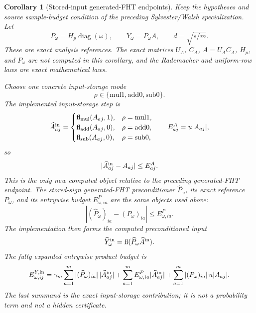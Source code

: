 \documentclass[11pt]{article}
\newcommand{\fl}{\operatorname{fl}}
\newcommand{\diag}{\operatorname{diag}}
\newtheorem{corollary}[theorem]{Corollary}
\theoremstyle{remark}
\begin{document}
\begin{corollary}[Stored-input generated-FHT endpoints]
Keep the hypotheses and source sample-budget condition of the preceding
Sylvester/Walsh specialization.  Let
\[
  P_\omega=H_p\diag(\omega),
  \qquad
  Y_\omega=P_\omega A,
  \qquad
  d=\sqrt{s/m}.
\]
These are exact analysis references.  The exact matrices \(U_A\), \(C_A\),
\(A=U_AC_A\), \(H_p\), and \(P_\omega\) are not computed in this corollary,
and the Rademacher and uniform-row laws are exact mathematical laws.

Choose one concrete input-storage mode
\[
  \rho\in\{\mathrm{mul1},\mathrm{add0},\mathrm{sub0}\}.
\]
The implemented input-storage step is
\[
  \widehat A^{\rm in}_{aj}=
  \begin{cases}
    \fl_{\rm mul}(A_{aj},1),&\rho=\mathrm{mul1},\\
    \fl_{\rm add}(A_{aj},0),&\rho=\mathrm{add0},\\
    \fl_{\rm sub}(A_{aj},0),&\rho=\mathrm{sub0},
  \end{cases}
  \qquad
  E^A_{aj}=u|A_{aj}|,
\]
so
\[
  |\widehat A^{\rm in}_{aj}-A_{aj}|\le E^A_{aj}.
\]
This is the only new computed object relative to the preceding
generated-FHT endpoint.  The stored-sign generated-FHT preconditioner
\(\widehat P_\omega\), its exact reference \(P_\omega\), and its entrywise
budget \(E^P_{\omega,ia}\) are the same objects used above:
\[
  |(\widehat P_\omega)_{ia}-(P_\omega)_{ia}|
  \le E^P_{\omega,ia}.
\]
The implementation then forms the computed preconditioned input
\[
  \widehat Y^{\rm in}_{\omega}
  =
  \fl(\widehat P_\omega \widehat A^{\rm in}).
\]
The fully expanded entrywise product budget is
\[
  E^{Y,{\rm in}}_{\omega,ij}
  =
  \gamma_m\sum_{a=1}^m
    |(\widehat P_\omega)_{ia}|\,|\widehat A^{\rm in}_{aj}|
  +
  \sum_{a=1}^m E^P_{\omega,ia}|\widehat A^{\rm in}_{aj}|
  +
  \sum_{a=1}^m |(P_\omega)_{ia}|\,u|A_{aj}|.
\]
The last summand is the exact input-storage contribution; it is not a
probability term and not a hidden certificate.


\end{corollary}
\end{document}
